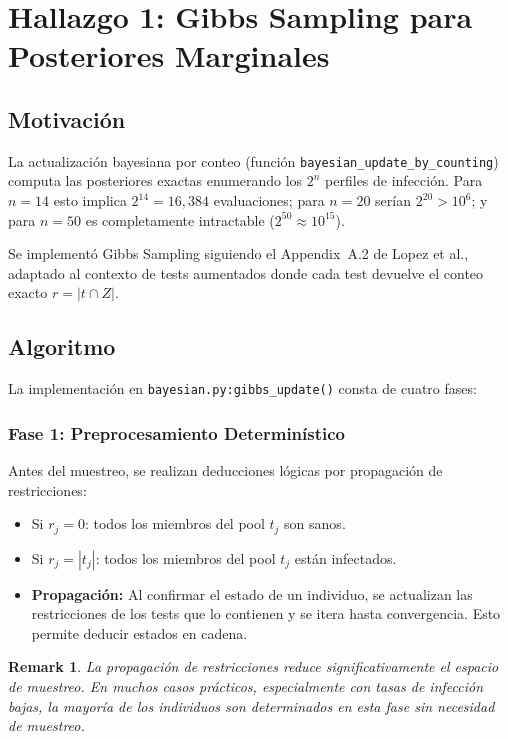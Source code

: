 \documentclass[11pt, a4paper]{article}
\newtheorem{remark}{Remark}
\begin{document}
\section{Hallazgo 1: Gibbs Sampling para Posteriores Marginales}
\label{sec:gibbs}

\subsection{Motivaci\'on}
La actualizaci\'on bayesiana por conteo (funci\'on
\texttt{bayesian\_update\_by\_counting}) computa las posteriores exactas
enumerando los $2^n$ perfiles de infecci\'on. Para $n = 14$ esto implica
$2^{14} = 16{,}384$ evaluaciones; para $n = 20$ ser\'ian $2^{20} > 10^6$;
y para $n = 50$ es completamente intractable ($2^{50} \approx 10^{15}$).

Se implement\'o Gibbs Sampling siguiendo el Appendix~A.2 de Lopez et al.,
adaptado al contexto de tests aumentados donde cada test devuelve el
conteo exacto $r = |t \cap Z|$.

\subsection{Algoritmo}
La implementaci\'on en \texttt{bayesian.py:gibbs\_update()} consta de
cuatro fases:

\subsubsection{Fase 1: Preprocesamiento Determin\'istico}
Antes del muestreo, se realizan deducciones l\'ogicas por propagaci\'on
de restricciones:
\begin{itemize}[nosep]
    \item Si $r_j = 0$: todos los miembros del pool $t_j$ son sanos.
    \item Si $r_j = |t_j|$: todos los miembros del pool $t_j$ est\'an
    infectados.
    \item \textbf{Propagaci\'on:} Al confirmar el estado de un individuo,
    se actualizan las restricciones de los tests que lo contienen y se
    itera hasta convergencia. Esto permite deducir estados en cadena.
\end{itemize}

\begin{remark}
La propagaci\'on de restricciones reduce significativamente el espacio
de muestreo. En muchos casos pr\'acticos, especialmente con tasas de
infecci\'on bajas, la mayor\'ia de los individuos son determinados en
esta fase sin necesidad de muestreo.
\end{remark}
\end{document}
